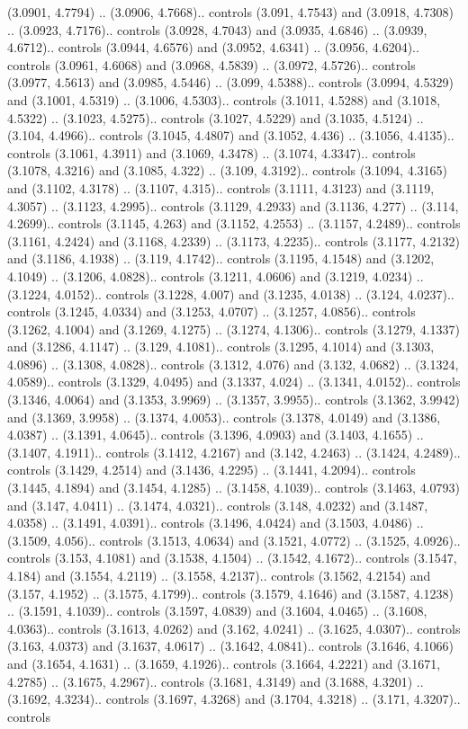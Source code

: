 (3.0901, 4.7794) .. (3.0906, 4.7668).. controls (3.091, 4.7543) and (3.0918, 4.7308) .. (3.0923, 4.7176).. controls (3.0928, 4.7043) and (3.0935, 4.6846) .. (3.0939, 4.6712).. controls (3.0944, 4.6576) and (3.0952, 4.6341) .. (3.0956, 4.6204).. controls (3.0961, 4.6068) and (3.0968, 4.5839) .. (3.0972, 4.5726).. controls (3.0977, 4.5613) and (3.0985, 4.5446) .. (3.099, 4.5388).. controls (3.0994, 4.5329) and (3.1001, 4.5319) .. (3.1006, 4.5303).. controls (3.1011, 4.5288) and (3.1018, 4.5322) .. (3.1023, 4.5275).. controls (3.1027, 4.5229) and (3.1035, 4.5124) .. (3.104, 4.4966).. controls (3.1045, 4.4807) and (3.1052, 4.436) .. (3.1056, 4.4135).. controls (3.1061, 4.3911) and (3.1069, 4.3478) .. (3.1074, 4.3347).. controls (3.1078, 4.3216) and (3.1085, 4.322) .. (3.109, 4.3192).. controls (3.1094, 4.3165) and (3.1102, 4.3178) .. (3.1107, 4.315).. controls (3.1111, 4.3123) and (3.1119, 4.3057) .. (3.1123, 4.2995).. controls (3.1129, 4.2933) and (3.1136, 4.277) .. (3.114, 4.2699).. controls (3.1145, 4.263) and (3.1152, 4.2553) .. (3.1157, 4.2489).. controls (3.1161, 4.2424) and (3.1168, 4.2339) .. (3.1173, 4.2235).. controls (3.1177, 4.2132) and (3.1186, 4.1938) .. (3.119, 4.1742).. controls (3.1195, 4.1548) and (3.1202, 4.1049) .. (3.1206, 4.0828).. controls (3.1211, 4.0606) and (3.1219, 4.0234) .. (3.1224, 4.0152).. controls (3.1228, 4.007) and (3.1235, 4.0138) .. (3.124, 4.0237).. controls (3.1245, 4.0334) and (3.1253, 4.0707) .. (3.1257, 4.0856).. controls (3.1262, 4.1004) and (3.1269, 4.1275) .. (3.1274, 4.1306).. controls (3.1279, 4.1337) and (3.1286, 4.1147) .. (3.129, 4.1081).. controls (3.1295, 4.1014) and (3.1303, 4.0896) .. (3.1308, 4.0828).. controls (3.1312, 4.076) and (3.132, 4.0682) .. (3.1324, 4.0589).. controls (3.1329, 4.0495) and (3.1337, 4.024) .. (3.1341, 4.0152).. controls (3.1346, 4.0064) and (3.1353, 3.9969) .. (3.1357, 3.9955).. controls (3.1362, 3.9942) and (3.1369, 3.9958) .. (3.1374, 4.0053).. controls (3.1378, 4.0149) and (3.1386, 4.0387) .. (3.1391, 4.0645).. controls (3.1396, 4.0903) and (3.1403, 4.1655) .. (3.1407, 4.1911).. controls (3.1412, 4.2167) and (3.142, 4.2463) .. (3.1424, 4.2489).. controls (3.1429, 4.2514) and (3.1436, 4.2295) .. (3.1441, 4.2094).. controls (3.1445, 4.1894) and (3.1454, 4.1285) .. (3.1458, 4.1039).. controls (3.1463, 4.0793) and (3.147, 4.0411) .. (3.1474, 4.0321).. controls (3.148, 4.0232) and (3.1487, 4.0358) .. (3.1491, 4.0391).. controls (3.1496, 4.0424) and (3.1503, 4.0486) .. (3.1509, 4.056).. controls (3.1513, 4.0634) and (3.1521, 4.0772) .. (3.1525, 4.0926).. controls (3.153, 4.1081) and (3.1538, 4.1504) .. (3.1542, 4.1672).. controls (3.1547, 4.184) and (3.1554, 4.2119) .. (3.1558, 4.2137).. controls (3.1562, 4.2154) and (3.157, 4.1952) .. (3.1575, 4.1799).. controls (3.1579, 4.1646) and (3.1587, 4.1238) .. (3.1591, 4.1039).. controls (3.1597, 4.0839) and (3.1604, 4.0465) .. (3.1608, 4.0363).. controls (3.1613, 4.0262) and (3.162, 4.0241) .. (3.1625, 4.0307).. controls (3.163, 4.0373) and (3.1637, 4.0617) .. (3.1642, 4.0841).. controls (3.1646, 4.1066) and (3.1654, 4.1631) .. (3.1659, 4.1926).. controls (3.1664, 4.2221) and (3.1671, 4.2785) .. (3.1675, 4.2967).. controls (3.1681, 4.3149) and (3.1688, 4.3201) .. (3.1692, 4.3234).. controls (3.1697, 4.3268) and (3.1704, 4.3218) .. (3.171, 4.3207).. controls 